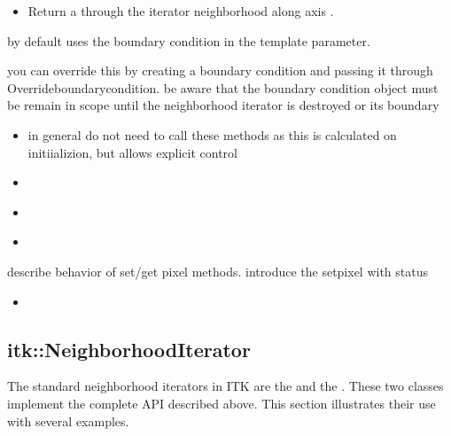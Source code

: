 {\begin{itemize}
\item \textbf{} Return a
 through the iterator neighborhood along axis .

\end{itemize}




by default uses the boundary condition in the template parameter.

you can override this by creating a boundary condition and passing it through
Overrideboundarycondition.  be aware that the boundary condition object must be
remain in scope until the neighborhood iterator is destroyed or its boundary
 

\begin{itemize}
\item \textbf{} in general do not
need to call these methods as this is calculated on initiializion, but allows
explicit control
\item \textbf{} 
\item \textbf{} 
\item \textbf{} 
\end{itemize}

describe behavior of set/get pixel methods.  introduce the setpixel with status
\begin{itemize}
\item \textbf{} 
\end{itemize}



\subsection{itk::NeighborhoodIterator}
\label{sec:itkNeighborhoodIterator}
The standard neighborhood iterators in ITK are the
 and the
.  These two classes implement the complete API
described above.  This section illustrates their use with several examples.








}
